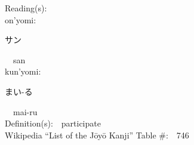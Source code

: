 \begin{multicols}{2}
Reading(s):\ \ \\
{\hspace*{1em}}on'yomi:\ \ \\
{\hspace*{2em}}{\begin{CJK}{UTF8}{min} サン \end{CJK}}\ \ san\ \ \\
{\hspace*{1em}}kun'yomi:\ \ \\
{\hspace*{2em}}{\begin{CJK}{UTF8}{min} まい-る \end{CJK}}\ \ mai-ru\ \ \\
Definition(s):\ \ participate \\
Wikipedia ``List of the J\=oy\=o Kanji'' Table \#:\ \ 746 \\
\ \ \\
\end{multicols}



